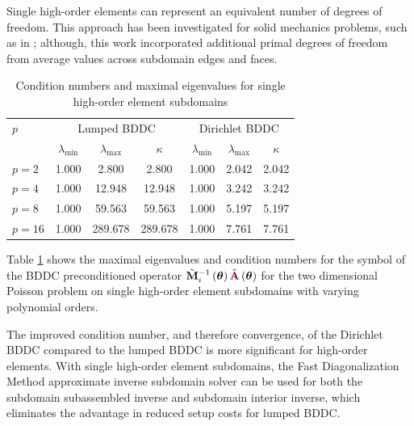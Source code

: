Single high-order elements can represent an equivalent number of degrees of freedom.
This approach has been investigated for solid mechanics problems, such as in \cite{pavarino2010bddc}; although, this work incorporated additional primal degrees of freedom from average values across subdomain edges and faces.

\begin{table}[ht!]
\begin{center}
\begin{tabular}{l ccc ccc}
  \toprule
  $p$  &  \multicolumn{3}{c}{Lumped BDDC}  &  \multicolumn{3}{c}{Dirichlet BDDC}  \\
                      &  $\lambda_{\min}$  &  $\lambda_{\max}$  &  $\kappa$ & $\lambda_{\min}$  &  $\lambda_{\max}$ & $\kappa$  \\
  \toprule
  $p = 2$   &  1.000  &    2.800  &    2.800  &  1.000  &  2.042  &  2.042  \\
  $p = 4$   &  1.000  &   12.948  &   12.948  &  1.000  &  3.242  &  3.242  \\
  $p = 8$   &  1.000  &   59.563  &   59.563  &  1.000  &  5.197  &  5.197  \\
  $p = 16$  &  1.000  &  289.678  &  289.678  &  1.000  &  7.761  &  7.761  \\
  \bottomrule
\end{tabular}
\end{center}
\caption{Condition numbers and maximal eigenvalues for single high-order element subdomains}
\label{table:high_order_element_bddc}
\end{table}

Table \ref{table:high_order_element_bddc} shows the maximal eigenvalues and condition numbers for the symbol of the BDDC preconditioned operator $\tilde{\mathbf{M}}^{-1}_i \left( \boldsymbol{\theta} \right) \tilde{{\color{burgundy}\mathbf{A}}} \left( \boldsymbol{\theta} \right)$ for the two dimensional Poisson problem on single high-order element subdomains with varying polynomial orders.

The improved condition number, and therefore convergence, of the Dirichlet BDDC compared to the lumped BDDC is more significant for high-order elements.
With single high-order element subdomains, the Fast Diagonalization Method approximate inverse subdomain solver can be used for both the subdomain subassembled inverse and subdomain interior inverse, which eliminates the advantage in reduced setup costs for lumped BDDC.

